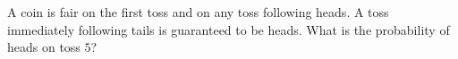 A coin is fair on the first toss and on any toss following heads. A toss immediately following tails is guaranteed to be heads. What is the probability of heads on toss $5$?
